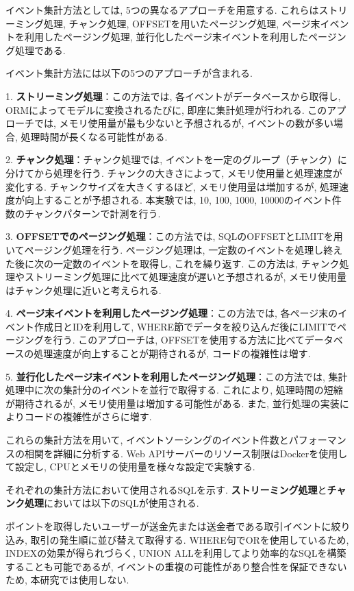 \documentclass[../../../main]{subfiles}
\begin{document}
    イベント集計方法としては, 5つの異なるアプローチを用意する. これらはストリーミング処理, チャンク処理, OFFSETを用いたページング処理, ページ末イベントを利用したページング処理, 並行化したページ末イベントを利用したページング処理である.

    イベント集計方法には以下の5つのアプローチが含まれる.

    1. \textbf{ストリーミング処理}：この方法では, 各イベントがデータベースから取得し, ORMによってモデルに変換されるたびに, 即座に集計処理が行われる. このアプローチでは, メモリ使用量が最も少ないと予想されるが, イベントの数が多い場合, 処理時間が長くなる可能性がある.

    2. \textbf{チャンク処理}：チャンク処理では, イベントを一定のグループ（チャンク）に分けてから処理を行う. チャンクの大きさによって, メモリ使用量と処理速度が変化する. チャンクサイズを大きくするほど, メモリ使用量は増加するが, 処理速度が向上することが予想される. 本実験では, 10, 100, 1000, 10000のイベント件数のチャンクパターンで計測を行う.

    3. \textbf{OFFSETでのページング処理}：この方法では, SQLのOFFSETとLIMITを用いてページング処理を行う. ページング処理は, 一定数のイベントを処理し終えた後に次の一定数のイベントを取得し, これを繰り返す. この方法は, チャンク処理やストリーミング処理に比べて処理速度が遅いと予想されるが, メモリ使用量はチャンク処理に近いと考えられる.

    4. \textbf{ページ末イベントを利用したページング処理}：この方法では, 各ページ末のイベント作成日とIDを利用して, WHERE節でデータを絞り込んだ後にLIMITでページングを行う. このアプローチは, OFFSETを使用する方法に比べてデータベースの処理速度が向上することが期待されるが, コードの複雑性は増す.

    5. \textbf{並行化したページ末イベントを利用したページング処理}：この方法では, 集計処理中に次の集計分のイベントを並行で取得する. これにより, 処理時間の短縮が期待されるが, メモリ使用量は増加する可能性がある. また, 並行処理の実装によりコードの複雑性がさらに増す.

    これらの集計方法を用いて, イベントソーシングのイベント件数とパフォーマンスの相関を詳細に分析する. Web APIサーバーのリソース制限はDockerを使用して設定し, CPUとメモリの使用量を様々な設定で実験する.

    それぞれの集計方法において使用されるSQLを示す. \textbf{ストリーミング処理}と\textbf{チャンク処理}においては以下のSQLが使用される.

    

    ポイントを取得したいユーザーが送金先または送金者である取引イベントに絞り込み, 取引の発生順に並び替えて取得する. WHERE句でORを使用しているため, INDEXの効果が得られづらく, UNION ALLを利用してより効率的なSQLを構築することも可能であるが, イベントの重複の可能性があり整合性を保証できないため, 本研究では使用しない.
\end{document}
